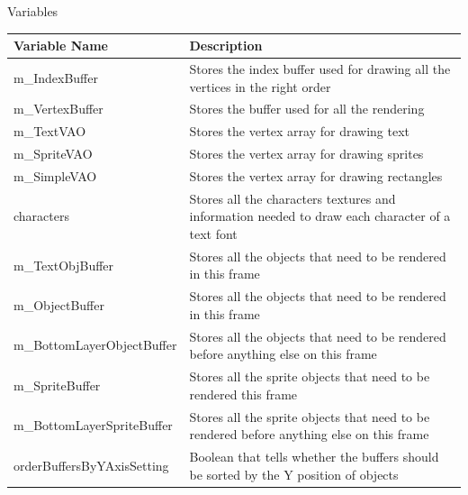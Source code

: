 \documentclass{article}
\begin{document}
                \begin{center}
                    Variables
                    \begin{tabular}{ | m{} | m{} | }
                        \hline
                        \textbf{Variable Name} & \textbf{Description} \\
                        \hline
                        m\_IndexBuffer & Stores the index buffer used for drawing all the vertices in the right order \\
                        \hline
                        m\_VertexBuffer & Stores the buffer used for all the rendering \\
                        \hline
                        m\_TextVAO & Stores the vertex array for drawing text \\
                        \hline
                        m\_SpriteVAO & Stores the vertex array for drawing sprites\\
                        \hline
                        m\_SimpleVAO & Stores the vertex array for drawing rectangles\\
                        \hline
                        characters & Stores all the characters textures and information needed to draw each character of a text font \\
                        \hline
                        m\_TextObjBuffer & Stores all the objects that need to be rendered in this frame \\
                        \hline
                        m\_ObjectBuffer & Stores all the objects that need to be rendered in this frame \\
                        \hline
                        m\_BottomLayerObjectBuffer & Stores all the objects that need to be rendered before anything else on this frame \\
                        \hline
                        m\_SpriteBuffer & Stores all the sprite objects that need to be rendered this frame \\
                        \hline
                        m\_BottomLayerSpriteBuffer & Stores all the sprite objects that need to be rendered before anything else on this frame \\
                        \hline
                        orderBuffersByYAxisSetting & Boolean that tells whether the buffers should be sorted by the Y position of objects \\
                        \hline

\end{tabular}
\end{center}
\end{document}

